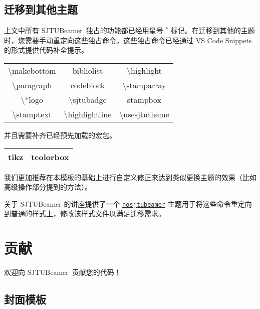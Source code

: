 \documentclass[
    UTF8,
    heading=true,
    12pt,
    a4paper
]{ctexrep}
\newcommand{\cls}[1]{\texttt{#1}}
\def\themename{\textsf{SJTUBeamer}}
\begin{document}
\section{迁移到其他主题}

上文中所有 \themename\ 独占的功能都已经用星号 $^*$ 标记。在迁移到其他的主题时，您需要手动重定向这些独占命令。这些独占命令已经通过 VS Code Snippets 的形式提供代码补全提示。

\begin{table}[h]
  \centering
  \begin{tabular}{>{\ttfamily}c>{\ttfamily}c>{\ttfamily}c}
    \hline
    \textbackslash{}makebottom & bibliolist                    & \textbackslash{}highlight    \\
    \textbackslash{}paragraph  & codeblock                     & \textbackslash{}stamparray   \\
    \textbackslash{}*logo      & \textbackslash{}sjtubadge     & stampbox                     \\
    \textbackslash{}stamptext  & \textbackslash{}highlightline & \textbackslash{}usesjtutheme \\
    \hline
  \end{tabular}
\end{table}

并且需要补齐已经预先加载的宏包。

\begin{table}[h]
  \centering
  \begin{tabular}{>{\sffamily}c>{\sffamily}c}
    \hline
    tikz & tcolorbox \\
    \hline
  \end{tabular}
\end{table}

我们更加推荐在本模板的基础上进行自定义修正来达到类似更换主题的效果（比如高级操作部分提到的方法）。

关于 \themename{} 的讲座提供了一个 \href{https://github.com/sjtug/sjtulib-latex-talk/blob/logcreative-2022/beamerthemenosjtubeamer.sty}{\cls{nosjtubeamer}} 主题用于将这些命令重定向到普通的样式上，修改该样式文件以满足迁移需求。

\chapter{贡献}

欢迎向 \themename\ 贡献您的代码！

\section{封面模板}
\end{document}
